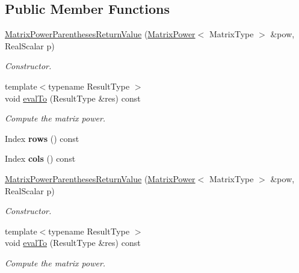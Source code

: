 \subsection*{Public Member Functions}
\begin{DoxyCompactItemize}
\item 
\hyperlink{class_eigen_1_1_matrix_power_parentheses_return_value_ae3a02d943a31427a6dc8c1f60f3367d7}{Matrix\+Power\+Parentheses\+Return\+Value} (\hyperlink{class_eigen_1_1_matrix_power}{Matrix\+Power}$<$ Matrix\+Type $>$ \&pow, Real\+Scalar p)
\begin{DoxyCompactList}\small\item\em Constructor. \end{DoxyCompactList}\item 
{\footnotesize template$<$typename Result\+Type $>$ }\\void \hyperlink{class_eigen_1_1_matrix_power_parentheses_return_value_a4022dd383b54272e53e52f4f7059579f}{eval\+To} (Result\+Type \&res) const
\begin{DoxyCompactList}\small\item\em Compute the matrix power. \end{DoxyCompactList}\item 
\mbox{\label{class_eigen_1_1_matrix_power_parentheses_return_value_a3d4c222d1ac986d5634d48e7c4c063ba}} 
Index {\bfseries rows} () const
\item 
\mbox{\label{class_eigen_1_1_matrix_power_parentheses_return_value_aa28962cac15946c4855f8155aa55c371}} 
Index {\bfseries cols} () const
\item 
\hyperlink{class_eigen_1_1_matrix_power_parentheses_return_value_ae3a02d943a31427a6dc8c1f60f3367d7}{Matrix\+Power\+Parentheses\+Return\+Value} (\hyperlink{class_eigen_1_1_matrix_power}{Matrix\+Power}$<$ Matrix\+Type $>$ \&pow, Real\+Scalar p)
\begin{DoxyCompactList}\small\item\em Constructor. \end{DoxyCompactList}\item 
{\footnotesize template$<$typename Result\+Type $>$ }\\void \hyperlink{class_eigen_1_1_matrix_power_parentheses_return_value_a4022dd383b54272e53e52f4f7059579f}{eval\+To} (Result\+Type \&res) const
\begin{DoxyCompactList}\small\item\em Compute the matrix power. \end{DoxyCompactList}\item 

\end{DoxyCompactItemize}
